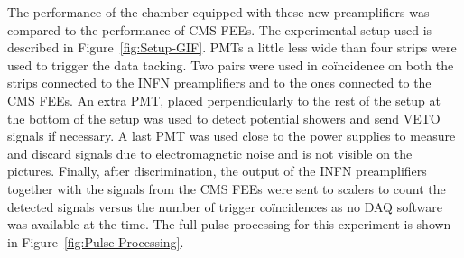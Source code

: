 	The performance of the chamber equipped with these new preamplifiers was compared to the performance of CMS FEEs. The experimental setup used is described in Figure~\ref{fig:Setup-GIF}. PMTs a little less wide than four strips were used to trigger the data tacking. Two pairs were used in coïncidence on both the strips connected to the INFN preamplifiers and to the ones connected to the CMS FEEs. An extra PMT, placed perpendicularly to the rest of the setup at the bottom of the setup was used to detect potential showers and send VETO signals if necessary. A last PMT was used close to the power supplies to measure and discard signals due to electromagnetic noise and is not visible on the pictures. Finally, after discrimination, the output of the INFN preamplifiers together with the signals from the CMS FEEs were sent to scalers to count the detected signals versus the number of trigger coïncidences as no DAQ software was available at the time. The full pulse processing for this experiment is shown in Figure~\ref{fig:Pulse-Processing}.
	 
